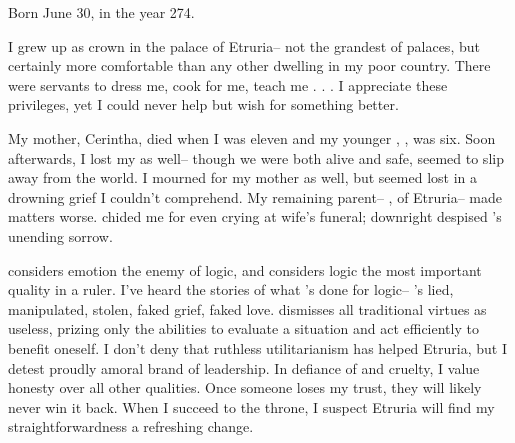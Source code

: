 \documentclass[char]{Kos}
\begin{document}
\name{\cGroom{}}

Born June 30, in the year 274.

I grew up as crown \cGroom{\prince} in the palace of Etruria-- not the grandest of palaces, but certainly more comfortable than any other dwelling in my poor country. There were servants to dress me, cook for me, teach me . . . I appreciate these privileges, yet I could never help but wish for something better.

My mother, Cerintha, died when I was eleven and my younger \cPoet{\sibling}, \cPoet{}, was six. Soon afterwards, I lost my \cPoet{\sibling} as well-- though we were both alive and safe, \cPoet{\they} seemed to slip away from the world. I mourned for my mother as well, but \cPoet{\they} seemed lost in a drowning grief I couldn't comprehend. My remaining parent-- \cEtruriaKing{}, \cEtruriaKing{\Monarch} of Etruria-- made matters worse. \cEtruriaKing{\They} chided me for even crying at \cEtruriaKing{\their} wife's funeral; \cEtruriaKing{\their} downright despised \cPoet{}'s unending sorrow. 

\cEtruriaKing{\Parent} considers emotion the enemy of logic, and \cEtruriaKing{\they} considers logic the most important quality in a ruler. I've heard the stories of what \cEtruriaKing{\they}'s done for logic-- \cEtruriaKing{\they}'s lied, manipulated, stolen, faked grief, faked love. \cEtruriaKing{\They} dismisses all traditional virtues as useless, prizing only the abilities to evaluate a situation and act efficiently to benefit oneself. I don't deny that \cEtruriaKing{\their} ruthless utilitarianism has helped Etruria, but I detest \cEtruriaKing{\their} proudly amoral brand of leadership. In defiance of \cEtruriaKing{\them} and \cEtruriaKing{\their} cruelty, I value honesty over all other qualities. Once someone loses my trust, they will likely never win it back. When I succeed to the throne, I suspect Etruria will find my straightforwardness a refreshing change.
\end{document}
